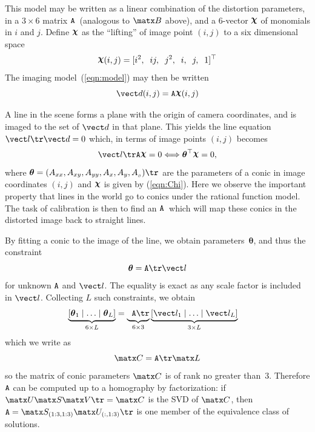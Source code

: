 \documentclass[extendedabs]{bmvc2k}
\begin{document}
\newcommand{\A}{\mbox{${\tt A}$}}
\newcommand{\Chi}{\raisebox{.4ex}{$\boldsymbol\chi$}}
This model may be written as a linear combination of the distortion
parameters, in a $3\times6$ matrix \A\ (analogous to $\matx B$
above), and a 6-vector $\Chi$ of monomials in $i$ and $j$.  Define
$\Chi$ as the ``lifting'' of image point $(i,j)$ to a six
dimensional space
\begin{equation}
\Chi(i,j) =
[i^2,\;\;ij,\;\;j^2,\;\;i,\;\;j,\;\;1]^{\top}\label{eqn:Chi}
\end{equation}
The imaging model~(\ref{eqn:model}) may then be written
\begin{equation}
\vect d(i,j) = \A \Chi(i,j) \label{eqn:project}
\end{equation}

\def\conic{{\boldsymbol\theta}}
A line in the scene forms a plane with the origin of camera
coordinates, and is imaged to the set of $\vect d$ in that plane.
This yields the line equation $\vect l\tr \vect d = 0$ which, in
terms of image points $(i,j)$ becomes
\begin{equation}
\vect l\tr \A \Chi = 0 \Longleftrightarrow \conic^{\top} \Chi = 0,
\end{equation}
where $\conic = (A_{xx}, A_{xy}, A_{yy}, A_x, A_y,
A_{_\mathit{0}})\tr$ are the parameters of a conic in image coordinates $(i,j)$
and $\Chi$ is given by (\ref{eqn:Chi}).  Here we observe the
important property that lines in the world go to conics under the
rational function model.  The task of calibration is then to find an
\A\ which will map these conics in the distorted image back to
straight lines.

By fitting a conic to the image of the line, we obtain
parameters~$\conic$, and thus the constraint
\[
\conic = \A\tr \vect l
\]
for unknown $\A$ and $\vect l$.  The equality is exact as any scale
factor is included in $\vect l$. Collecting $L$ such constraints, we
obtain
\begin{align}
\underbrace{\left[ \conic_1 \mid \ldots \mid \conic_L
\right]}_{6\times L} & =
\underbrace{\phantom{\left[\right]}\A\tr}_{6\times 3}
\underbrace{\left[ \vect l_1 \mid \ldots \mid \vect l_L \right]}_{3\times L}
\nonumber
\end{align}
which we write as
\[
\matx C = \A\tr \matx L\label{eqn:proj_line}
\]
so the matrix of conic parameters $\matx C$ is of rank no greater
than~$3$.  Therefore $\A$ can be computed up to a homography by
factorization: if $\matx U \matx S \matx V\tr = \matx C$ is the SVD
of $\matx C$, then $\A = \matx S_{(1:3,1:3)} {\matx U_{(:,1:3)}}\tr$
is one member of the equivalence class of solutions.
\end{document}
